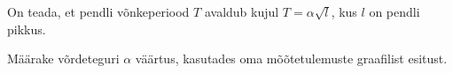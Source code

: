 On teada, et pendli võnkeperiood $T$ avaldub kujul $T = \alpha\sqrt{l}$, kus
$l$ on pendli pikkus.

Määrake võrdeteguri $\alpha$ väärtus, kasutades oma mõõtetulemuste graafilist
esitust.

